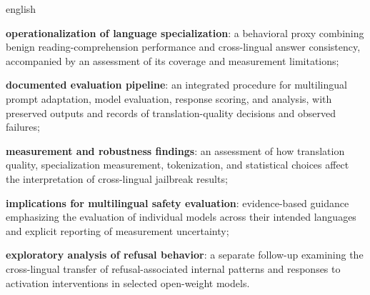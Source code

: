 \begin{otherlanguage*}{english}
\begin{alineas}
    \item \textbf{operationalization of language specialization}: a behavioral proxy combining benign reading-comprehension performance and cross-lingual answer consistency, accompanied by an assessment of its coverage and measurement limitations;

    \item \textbf{documented evaluation pipeline}: an integrated procedure for multilingual prompt adaptation, model evaluation, response scoring, and analysis, with preserved outputs and records of translation-quality decisions and observed failures;

    \item \textbf{measurement and robustness findings}: an assessment of how translation quality, specialization measurement, tokenization, and statistical choices affect the interpretation of cross-lingual jailbreak results;

    \item \textbf{implications for multilingual safety evaluation}: evidence-based guidance emphasizing the evaluation of individual models across their intended languages and explicit reporting of measurement uncertainty;

    \item \textbf{exploratory analysis of refusal behavior}: a separate follow-up examining the cross-lingual transfer of refusal-associated internal patterns and responses to activation interventions in selected open-weight models.
\end{alineas}

\end{otherlanguage*}
